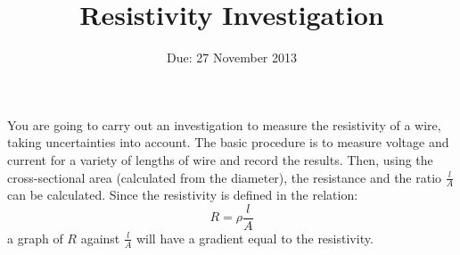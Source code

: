 \documentclass[11pt]{article}
\title{Resistivity Investigation}
\author{}
\date{Due: 27 November 2013}
\begin{document}
\maketitle \thispagestyle{empty}
\begin{adjustwidth}{2cm}{2cm}
You are going to carry out an investigation to measure the resistivity of a wire, taking uncertainties into account.  The basic procedure is to measure voltage and current for a variety of lengths of wire and record the results.  Then, using the cross-sectional area (calculated from the diameter), the resistance and the ratio $ \frac{l}{A} $ can be calculated.  Since the resistivity is defined in the relation: \[ R = \rho \frac{l}{A} \] a graph of $ R $ against $ \frac{l}{A} $ will have a gradient equal to the resistivity.
\end{adjustwidth}
\end{document}
